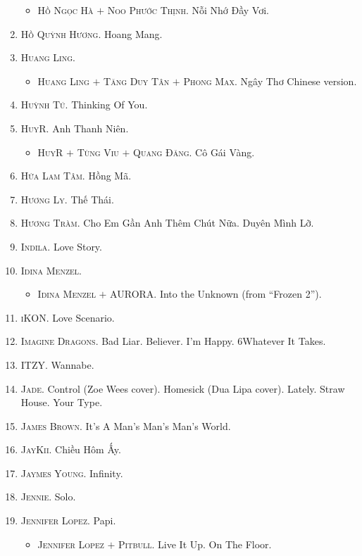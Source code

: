 \documentclass{article}
\begin{document}
\begin{enumerate}
\begin{itemize}
		\item \textsc{Hồ Ngọc Hà $+$ Noo Phước Thịnh.} Nỗi Nhớ Đầy Vơi.
	\end{itemize}
	\item \textsc{Hồ Quỳnh Hương.} Hoang Mang.
	\item \textsc{Huang Ling.}
	\begin{itemize}
		\item \textsc{Huang Ling $+$ Tăng Duy Tân $+$ Phong Max.} Ngây Thơ Chinese version.
	\end{itemize}
	\item \textsc{Huỳnh Tú.} Thinking Of You.
	\item \textsc{HuyR.} Anh Thanh Niên.
	\begin{itemize}
		\item \textsc{HuyR $+$ Tùng Viu $+$ Quang Đăng.} Cô Gái Vàng.
	\end{itemize}
	\item \textsc{Hứa Lam Tâm.} Hồng Mã.
	\item \textsc{Hương Ly.} Thế Thái.
	\item \textsc{Hương Tràm.} Cho Em Gần Anh Thêm Chút Nữa. Duyên Mình Lỡ.
	\item \textsc{Indila.} Love Story.
	\item \textsc{Idina Menzel.}
	\begin{itemize}
		\item \textsc{Idina Menzel $+$ AURORA.} Into the Unknown (from ``Frozen 2'').
	\end{itemize}
	\item \textsc{iKON.} Love Scenario. 
	\item \textsc{Imagine Dragons.} Bad Liar. Believer. I'm Happy. 6Whatever It Takes.
	\item \textsc{ITZY.} Wannabe.
	\item \textsc{Jade.} Control (Zoe Wees cover). Homesick (Dua Lipa cover). Lately. Straw House. Your Type.
	\item \textsc{James Brown.} It's A Man's Man's Man's World.
	\item \textsc{JayKii.} Chiều Hôm Ấy.
	\item \textsc{Jaymes Young.} Infinity.
	\item \textsc{Jennie.} Solo.
	\item \textsc{Jennifer Lopez.} Papi.
	\begin{itemize}
		\item \textsc{Jennifer Lopez $+$ Pitbull.} Live It Up. On The Floor.
	\end{itemize}

\end{enumerate}
\end{document}
